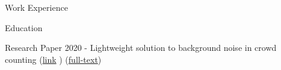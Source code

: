\documentclass{resume} %
\begin{document}
\begin{rSection}{Work Experience}
{{{{{{\begin{rSection}{Education}

\end{rSection}
\begin{rSection}{Research Paper}
2020 - Lightweight solution to background noise in crowd counting 
(\href{https://ieeexplore.ieee.org/document/9335834}{link}  )
(\href{https://github.com/ttpro1995/NICS2020_paper/releases/tag/v1}{full-text})


\end{rSection}}}}}}}
\end{rSection}
\end{document}
